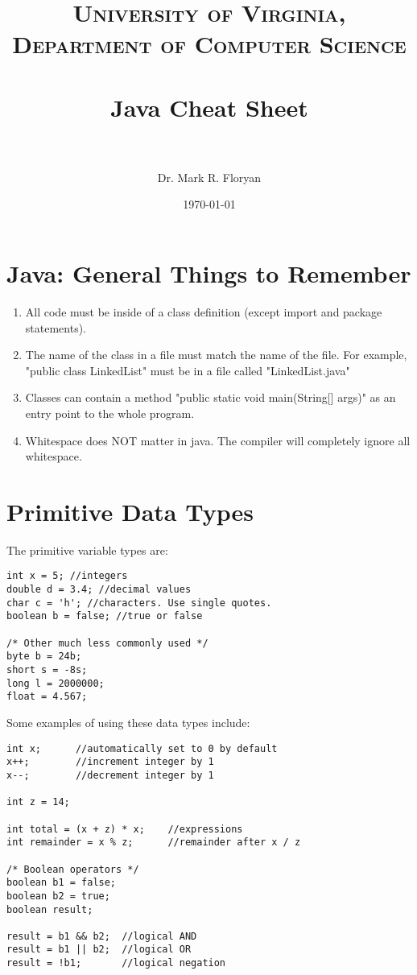 \documentclass[paper=a4, fontsize=11pt, parskip=full]{scrartcl} %
\title{	
\normalfont \normalsize 
\textsc{University of Virginia, Department of Computer Science} \\ [25pt] %
\horrule{0.5pt} \\[0.4cm] %
\huge Java Cheat Sheet \\ %
\horrule{2pt} \\[0.5cm] %
}
\author{Dr. Mark R. Floryan} %
\date{\normalsize\today} %
\numberwithin{equation}{section} %
\numberwithin{figure}{section} %
\numberwithin{table}{section} %
\begin{document}
\maketitle %


\section{Java: General Things to Remember}

\begin{enumerate}
	\item All code must be inside of a class definition (except import and package statements).
	\item The name of the class in a file must match the name of the file. For example, "public class LinkedList" must be in a file called "LinkedList.java"
	\item Classes can contain a method "public static void main(String[] args)" as an entry point to the whole program.
	\item Whitespace does NOT matter in java. The compiler will completely ignore all whitespace.
\end{enumerate}

\section{Primitive Data Types}

The primitive variable types are:

\begin{lstlisting}
int x = 5; //integers
double d = 3.4; //decimal values
char c = 'h'; //characters. Use single quotes.
boolean b = false; //true or false

/* Other much less commonly used */
byte b = 24b;
short s = -8s;
long l = 2000000;
float = 4.567;
\end{lstlisting}

Some examples of using these data types include:

\begin{lstlisting}
int x; 		//automatically set to 0 by default
x++; 		//increment integer by 1
x--; 		//decrement integer by 1

int z = 14;

int total = (x + z) * x; 	//expressions
int remainder = x % z; 		//remainder after x / z

/* Boolean operators */
boolean b1 = false;
boolean b2 = true;
boolean result;

result = b1 && b2; 	//logical AND
result = b1 || b2; 	//logical OR
result = !b1; 		//logical negation
\end{lstlisting}
\end{document}
